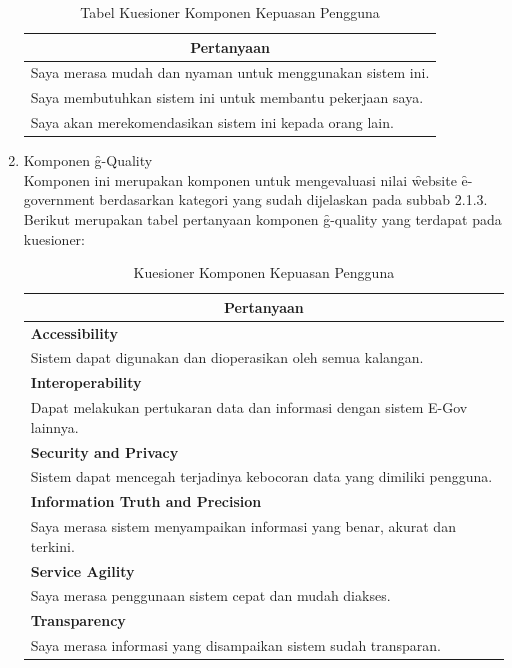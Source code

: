 \begin{enumerate}
	\begin{table}[h]
		\centering
		\caption{Tabel Kuesioner Komponen Kepuasan Pengguna}
		\begin{tabular}{|p{11.2cm}|}
			\hline
			\multicolumn{1}{|c|}{{\bf Pertanyaan}}						\\ \hline
			Saya merasa mudah dan nyaman untuk menggunakan sistem ini.	\\ \hline
			Saya membutuhkan sistem ini untuk membantu pekerjaan saya.	\\ \hline
			Saya akan merekomendasikan sistem ini kepada orang lain.	\\ \hline
		\end{tabular}
	\end{table}
	\item Komponen \f{g-Quality}\\
	Komponen ini merupakan komponen untuk mengevaluasi nilai \f{website} \f{e-government} berdasarkan kategori yang sudah dijelaskan pada subbab 2.1.3. Berikut merupakan tabel pertanyaan komponen \f{g-quality} yang terdapat pada kuesioner:
	\begin{table}[h]
		\centering
		\caption{Kuesioner Komponen Kepuasan Pengguna}
		\begin{tabular}{|p{11.2cm}|}
			\hline
			\multicolumn{1}{|c|}{{\bf Pertanyaan}}										\\ \hline
			{\bf Accessibility}															\\
			Sistem dapat digunakan dan dioperasikan oleh semua kalangan.               	\\ \hline
			{\bf Interoperability}                                                      \\
			Dapat melakukan pertukaran data dan informasi dengan sistem E-Gov lainnya.  \\ \hline
			{\bf Security and Privacy}                                                  \\
			Sistem dapat mencegah terjadinya kebocoran data yang dimiliki pengguna.     \\ \hline
			{\bf Information Truth and Precision}                                       \\
			Saya merasa sistem menyampaikan informasi yang benar, akurat dan terkini.   \\ \hline
			{\bf Service Agility}                                                       \\
			Saya merasa penggunaan sistem cepat dan mudah diakses.                      \\ \hline
			{\bf Transparency}                                                          \\
			Saya merasa informasi yang disampaikan sistem sudah transparan.				\\ \hline
		\end{tabular}
	\end{table}
\end{enumerate}
